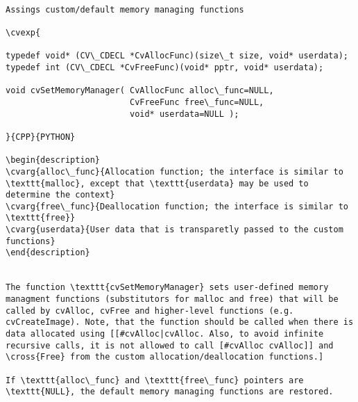 \label{SetMemoryManager}
\begin{verbatim}

Assings custom/default memory managing functions

\cvexp{

typedef void* (CV\_CDECL *CvAllocFunc)(size\_t size, void* userdata);
typedef int (CV\_CDECL *CvFreeFunc)(void* pptr, void* userdata);

void cvSetMemoryManager( CvAllocFunc alloc\_func=NULL,
                         CvFreeFunc free\_func=NULL,
                         void* userdata=NULL );

}{CPP}{PYTHON}

\begin{description}
\cvarg{alloc\_func}{Allocation function; the interface is similar to \texttt{malloc}, except that \texttt{userdata} may be used to determine the context}
\cvarg{free\_func}{Deallocation function; the interface is similar to \texttt{free}}
\cvarg{userdata}{User data that is transparetly passed to the custom functions}
\end{description}


The function \texttt{cvSetMemoryManager} sets user-defined memory managment functions (substitutors for malloc and free) that will be called by cvAlloc, cvFree and higher-level functions (e.g. cvCreateImage). Note, that the function should be called when there is data allocated using [[#cvAlloc|cvAlloc. Also, to avoid infinite recursive calls, it is not allowed to call [#cvAlloc cvAlloc]] and \cross{Free} from the custom allocation/deallocation functions.]

If \texttt{alloc\_func} and \texttt{free\_func} pointers are \texttt{NULL}, the default memory managing functions are restored.


\end{verbatim}
\label{SetIPLAllocators}
